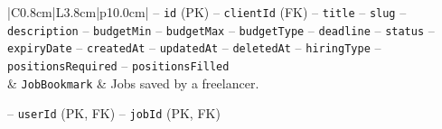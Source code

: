 \begin{center}
\begin{longtable}{|C{0.8cm}|L{3.8cm}|p{10.0cm}|}
\hspace*{1em}-- \texttt{id} (PK) \newline
\hspace*{1em}-- \texttt{client\allowbreak Id} (FK) \newline
\hspace*{1em}-- \texttt{title} \newline
\hspace*{1em}-- \texttt{slug} \newline
\hspace*{1em}-- \texttt{description} \newline
\hspace*{1em}-- \texttt{budget\allowbreak Min} \newline
\hspace*{1em}-- \texttt{budget\allowbreak Max} \newline
\hspace*{1em}-- \texttt{budget\allowbreak Type} \newline
\hspace*{1em}-- \texttt{deadline} \newline
\hspace*{1em}-- \texttt{status} \newline
\hspace*{1em}-- \texttt{expiry\allowbreak Date} \newline
\hspace*{1em}-- \texttt{created\allowbreak At} \newline
\hspace*{1em}-- \texttt{updated\allowbreak At} \newline
\hspace*{1em}-- \texttt{deleted\allowbreak At} \newline
\hspace*{1em}-- \texttt{hiring\allowbreak Type} \newline
\hspace*{1em}-- \texttt{positions\allowbreak Required} \newline
\hspace*{1em}-- \texttt{positions\allowbreak Filled} \\
 & \texttt{Job\allowbreak Bookmark} & Jobs saved by a freelancer.\par\smallskip
\hspace*{1em}-- \texttt{user\allowbreak Id} (PK, FK) \newline
\hspace*{1em}-- \texttt{job\allowbreak Id} (PK, FK) \newline

\end{longtable}
\end{center}
